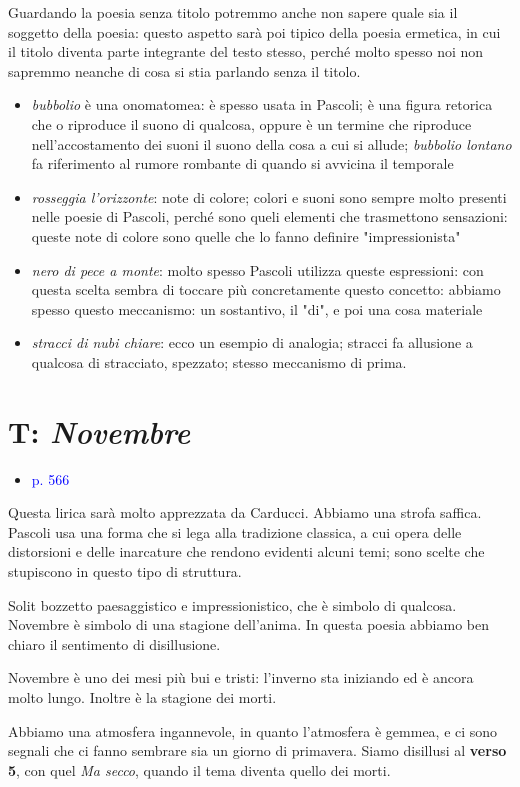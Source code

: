 \documentclass[a4paper, twoside, titlepage]{book}
\newcommand{\elenco}[1]{%
\begin{itemize}
#1
\end{itemize}}
\renewcommand{\emph}[1]{\textcolor{blue}{#1}}
\begin{document}
Guardando la poesia senza titolo potremmo anche non sapere quale sia il soggetto della poesia: questo aspetto sarà poi tipico della poesia ermetica, in cui il titolo diventa parte integrante del testo stesso, perché molto spesso noi non sapremmo neanche di cosa si stia parlando senza il titolo.

\elenco{\item \textit{bubbolio} è una onomatomea: è spesso usata in Pascoli; è una figura retorica che o riproduce il suono di qualcosa, oppure è un termine che riproduce nell'accostamento dei suoni il suono della cosa a cui si allude; \textit{bubbolio lontano} fa riferimento al rumore rombante di quando si avvicina il temporale
\item \textit{rosseggia l'orizzonte}: note di colore; colori e suoni sono sempre molto presenti nelle poesie di Pascoli, perché sono queli elementi che trasmettono sensazioni: queste note di colore sono quelle che lo fanno definire "impressionista"
\item \textit{nero di pece a monte}: molto spesso Pascoli utilizza queste espressioni: con questa scelta sembra di toccare più concretamente questo concetto: abbiamo spesso questo meccanismo: un sostantivo, il "di", e poi una cosa materiale
\item \textit{stracci di nubi chiare}: ecco un esempio di analogia; stracci fa allusione a qualcosa di stracciato, spezzato; stesso meccanismo di prima.
}


\section{T: \textit{Novembre}}
\elenco{\item \emph{p. 566}}

Questa lirica sarà molto apprezzata da Carducci.
Abbiamo una strofa saffica.
Pascoli usa una forma che si lega alla tradizione classica, a cui opera delle distorsioni e delle inarcature che rendono evidenti alcuni temi; sono scelte che stupiscono in questo tipo di struttura.

Solit bozzetto paesaggistico e impressionistico, che è simbolo di qualcosa. Novembre è simbolo di una stagione dell'anima.
In questa poesia abbiamo ben chiaro il sentimento di disillusione.

Novembre è uno dei mesi più bui e tristi: l'inverno sta iniziando ed è ancora molto lungo. Inoltre è la stagione dei morti.

Abbiamo una atmosfera ingannevole, in quanto l'atmosfera è gemmea, e ci sono segnali che ci fanno sembrare sia un giorno di primavera. Siamo disillusi al \textbf{verso 5}, con quel \textit{Ma secco}, quando il tema diventa quello dei morti.
\end{document}
